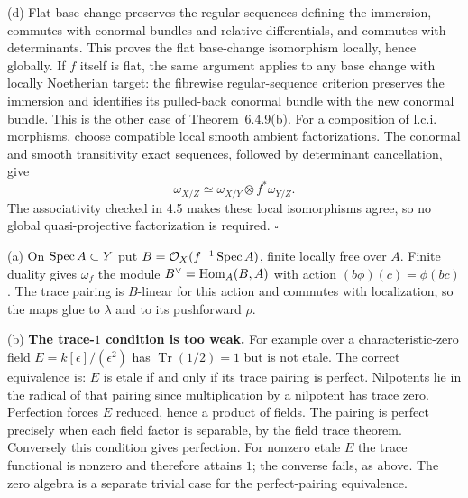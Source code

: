 \documentclass[11pt]{article}
\let\chapterexercise\exercise
\renewcommand{\exercise}[2]{\Needspace{8\baselineskip}\chapterexercise{#1}{#2}}
\begin{document}
(d) Flat base change preserves the regular sequences defining the immersion, commutes with conormal bundles and relative differentials, and commutes with determinants. This proves the flat base-change isomorphism locally, hence globally. If $f$ itself is flat, the same argument applies to any base change with locally Noetherian target: the fibrewise regular-sequence criterion preserves the immersion and identifies its pulled-back conormal bundle with the new conormal bundle. This is the other case of Theorem~6.4.9(b). For a composition of l.c.i. morphisms, choose compatible local smooth ambient factorizations. The conormal and smooth transitivity exact sequences, followed by determinant cancellation, give
\[ \omega_{X/Z}\simeq\omega_{X/Y}\otimes f^*\omega_{Y/Z}. \]
The associativity checked in 4.5 makes these local isomorphisms agree, so no global quasi-projective factorization is required. \hfill$\square$

\pf
(a) On $\operatorname{Spec} A\subset Y$ put $B=\mathcal O_X(f^{-1}\operatorname{Spec} A)$, finite locally free over $A$. Finite duality gives $\omega_f$ the module $B^\vee=\operatorname{Hom}_A(B,A)$ with action $(b\phi)(c)=\phi(bc)$. The trace pairing is $B$-linear for this action and commutes with localization, so the maps glue to $\lambda$ and to its pushforward $\rho$.

(b) \textbf{The trace-$1$ condition is too weak.} For example over a characteristic-zero field $E=k[\epsilon]/(\epsilon^2)$ has $\operatorname{Tr}(1/2)=1$ but is not etale. The correct equivalence is: $E$ is etale if and only if its trace pairing is perfect. Nilpotents lie in the radical of that pairing since multiplication by a nilpotent has trace zero. Perfection forces $E$ reduced, hence a product of fields. The pairing is perfect precisely when each field factor is separable, by the field trace theorem. Conversely this condition gives perfection. For nonzero etale $E$ the trace functional is nonzero and therefore attains $1$; the converse fails, as above. The zero algebra is a separate trivial case for the perfect-pairing equivalence.
\end{document}
